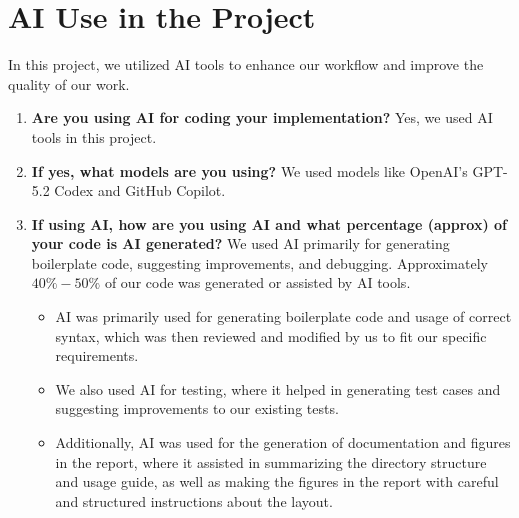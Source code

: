 \section*{AI Use in the Project}
In this project, we utilized AI tools to enhance our workflow and improve the quality of our work.
\begin{enumerate}
    \item \textbf{Are you using AI for coding your implementation?} Yes, we used AI tools in this project.
    \item \textbf{If yes, what models are you using?} We used models like OpenAI's GPT-5.2 Codex and GitHub Copilot.
    \item \textbf{If using AI, how are you using AI and what percentage (approx) of your code is AI generated?} We used AI primarily for generating boilerplate code, suggesting improvements, and debugging. Approximately $40\% - 50\%$ of our code was generated or assisted by AI tools.
    \begin{itemize}
        \item AI was primarily used for generating boilerplate code and usage of correct syntax, which was then reviewed and modified by us to fit our specific requirements.
        \item We also used AI for testing, where it helped in generating test cases and suggesting improvements to our existing tests.
        \item Additionally, AI was used for the generation of documentation and figures in the report, where it assisted in summarizing the directory structure and usage guide, as well as making the figures in the report with careful and structured instructions about the layout.
    \end{itemize}
\end{enumerate}